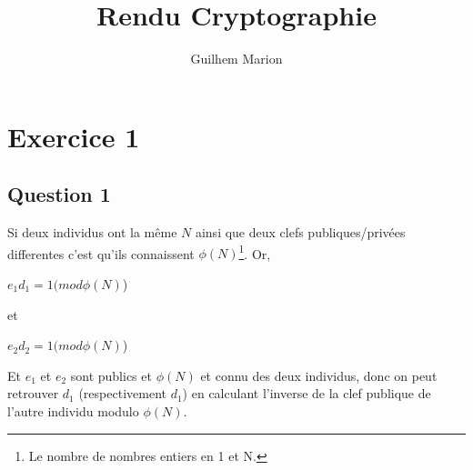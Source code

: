 \documentclass[10pt]{article}
\title{Rendu Cryptographie}
\author{Guilhem Marion}
\date{}                                           %
\begin{document}
\maketitle


\section*{Exercice 1}

\subsection*{Question 1}

Si deux individus ont la même $N$ ainsi que deux clefs publiques/privées differentes c'est qu'ils connaissent $\phi(N)$\footnote{Le nombre de nombres entiers en 1 et N.}. Or, 

\begin{center}

$e_1d_1 = 1  (mod \phi(N)$)

\end{center}

et 

\begin{center}

$e_2d_2 = 1   (mod \phi(N)$)

\end{center}

Et $e_1$ et $e_2$ sont publics et $\phi(N)$ et connu des deux individus, donc on peut retrouver $d_1$ (respectivement $d_1$) en calculant l'inverse de la clef publique de l'autre individu modulo $\phi(N)$.
\end{document}
